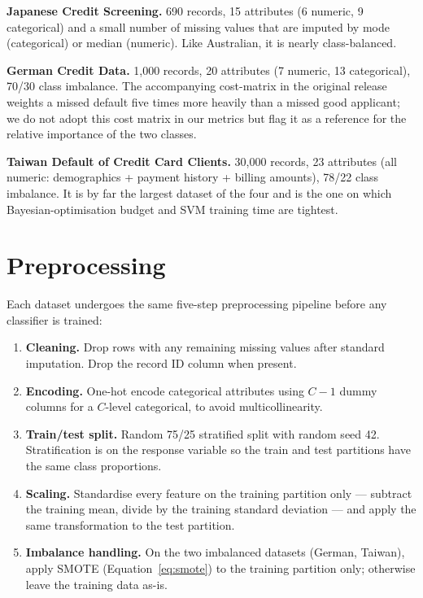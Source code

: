 \textbf{Japanese Credit Screening.} 690 records, 15 attributes
(6 numeric, 9 categorical) and a small number of missing values that
are imputed by mode (categorical) or median (numeric). Like
Australian, it is nearly class-balanced.

\textbf{German Credit Data.} 1{,}000 records, 20 attributes (7
numeric, 13 categorical), 70/30 class imbalance. The accompanying
cost-matrix in the original release weights a missed default five
times more heavily than a missed good applicant; we do not adopt
this cost matrix in our metrics but flag it as a reference for the
relative importance of the two classes.

\textbf{Taiwan Default of Credit Card Clients.} 30{,}000 records,
23 attributes (all numeric: demographics + payment history +
billing amounts), 78/22 class imbalance. It is by far the largest
dataset of the four and is the one on which Bayesian-optimisation
budget and SVM training time are tightest.

\section{Preprocessing}
\label{sec:preprocessing}

Each dataset undergoes the same five-step preprocessing pipeline
before any classifier is trained:

\begin{enumerate}
 \item \textbf{Cleaning.} Drop rows with any remaining missing
 values after standard imputation. Drop the record ID column
 when present.
 \item \textbf{Encoding.} One-hot encode categorical attributes
 using $C-1$ dummy columns for a $C$-level categorical, to avoid
 multicollinearity.
 \item \textbf{Train/test split.} Random 75/25 stratified split
 with random seed 42. Stratification is on the response variable
 so the train and test partitions have the same class proportions.
 \item \textbf{Scaling.} Standardise every feature on the training
 partition only --- subtract the training mean, divide by the
 training standard deviation --- and apply the same transformation
 to the test partition.
 \item \textbf{Imbalance handling.} On the two imbalanced datasets
 (German, Taiwan), apply SMOTE (Equation~\eqref{eq:smote}) to the
 training partition only; otherwise leave the training data as-is.
\end{enumerate}

